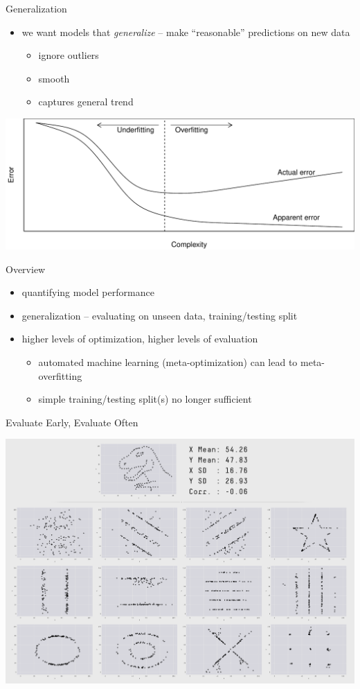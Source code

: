 \begin{frame}[c]{Generalization}
    \begin{itemize}
        \item we want models that \emph{generalize} -- make ``reasonable''
            predictions on new data
            \begin{itemize}
                \item ignore outliers
                \item smooth
                \item captures general trend
            \end{itemize}
    \end{itemize}
    \begin{center}
        \includegraphics[width=.5\textwidth]{overfitting}
    \end{center}
\end{frame}

\begin{frame}[c]{Overview}
    \begin{itemize}
        \item quantifying model performance
        \item generalization -- evaluating on unseen data, training/testing
            split
        \item higher levels of optimization, higher levels of evaluation
            \begin{itemize}
                \item automated machine learning (meta-optimization) can lead to
                    meta-overfitting
                \item simple training/testing split(s) no longer sufficient
            \end{itemize}
    \end{itemize}
\end{frame}

\begin{frame}[c]{Evaluate Early, Evaluate Often}
    \begin{center}
        \includegraphics[width=.6\textwidth]{datasaurus}
    \end{center}
\end{frame}


